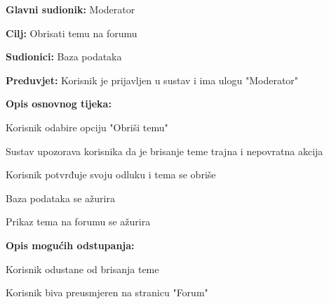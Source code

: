 					\noindent {}
					\begin{packed_item}
	
						\item \textbf{Glavni sudionik: }Moderator
						\item  \textbf{Cilj:} Obrisati temu na forumu
						\item  \textbf{Sudionici:} Baza podataka
						\item  \textbf{Preduvjet:} Korisnik je prijavljen u sustav i ima ulogu "Moderator"
						\item  \textbf{Opis osnovnog tijeka:}
						
						\item[] \begin{packed_enum}
	
							\item Korisnik odabire opciju "Obriši temu"
							\item Sustav upozorava korisnika da je brisanje teme trajna i nepovratna akcija
							\item Korisnik potvrđuje svoju odluku i tema se obriše
							\item Baza podataka se ažurira
							\item Prikaz tema na forumu se ažurira
						\end{packed_enum}
						
						\item  \textbf{Opis mogućih odstupanja:}
						
						\item[] \begin{packed_item}
	
							\item[3.a] Korisnik odustane od brisanja teme
							\item[] \begin{packed_enum}
								
								\item Korisnik biva preusmjeren na stranicu "Forum"
								
							\end{packed_enum}
							
						\end{packed_item}
					\end{packed_item}
					
